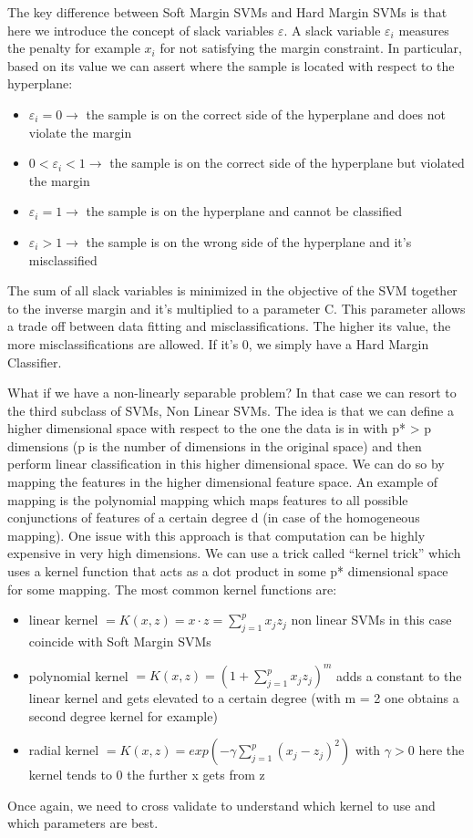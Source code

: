 \documentclass[journal]{IEEEtran}
\begin{document}
The key difference between Soft Margin SVMs and Hard Margin SVMs is that here we introduce the concept of slack variables $\varepsilon$. A slack variable $\varepsilon_i$ measures the penalty for example $x_i$ for not satisfying the margin constraint. In particular, based on its value we can assert where the sample is located with respect to the hyperplane:
\begin{itemize}
    \item $\varepsilon_i = 0 \rightarrow $ the sample is on the correct side of the hyperplane and does not violate the margin
    \item $0 < \varepsilon_i < 1 \rightarrow $ the sample is on the correct side of the hyperplane but violated the margin
    \item $\varepsilon_i = 1 \rightarrow $ the sample is on the hyperplane and cannot be classified
    \item $\varepsilon_i > 1 \rightarrow $ the sample is on the wrong side of the hyperplane and it’s misclassified
\end{itemize}
The sum of all slack variables is minimized in the objective of the SVM together to the inverse margin and it’s multiplied to a parameter C. This parameter allows a trade off between data fitting and misclassifications. The higher its value, the more misclassifications are allowed. If it’s 0, we simply have a Hard Margin Classifier.

What if we have a non-linearly separable problem? In that case we can resort to the third subclass of SVMs, Non Linear SVMs. The idea is that we can define a higher dimensional space with respect to the one the data is in with p* > p dimensions (p is the number of dimensions in the original space) and then perform linear classification in this higher dimensional space. We can do so by mapping the features in the higher dimensional feature space. An example of mapping is the polynomial mapping which maps features to all possible conjunctions of features of a certain degree d (in case of the homogeneous mapping). One issue with this approach is that computation can be highly expensive in very high dimensions. We can use a trick called “kernel trick” which uses a kernel function that acts as a dot product in some p* dimensional space for some mapping. The most common kernel functions are:
\begin{itemize}
    \item linear kernel $= K(x, z) = x \cdot z = \sum_{j=1}^{p} x_j z_j  $ non linear SVMs in this case coincide with Soft Margin SVMs
    \item polynomial kernel $ = K(x, z) = (1 + \sum_{j=1}^{p} x_j z_j)^{m}$ adds a constant to the linear kernel and gets elevated to a certain degree (with m = 2 one obtains a second degree kernel for example)
    \item radial kernel $= K(x, z) = exp(-\gamma \sum_{j=1}^{p} (x_j - z_j)^{2})$ with $\gamma > 0$ here the kernel tends to 0 the further x gets from z
\end{itemize}
Once again, we need to cross validate to understand which kernel to use and which parameters are best.
\end{document}
